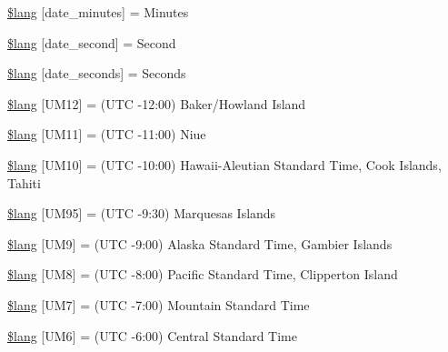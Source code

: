 \begin{DoxyCompactItemize}
\item 
\hyperlink{date__lang_8php_ab41862e6c3ef784a6e32992cfb9a6e1c}{\$lang} \mbox{[}\textquotesingle{}date\+\_\+minutes\textquotesingle{}\mbox{]} = \textquotesingle{}Minutes\textquotesingle{}
\item 
\hyperlink{date__lang_8php_ac1b67b9034a78d631bf5302df6105136}{\$lang} \mbox{[}\textquotesingle{}date\+\_\+second\textquotesingle{}\mbox{]} = \textquotesingle{}Second\textquotesingle{}
\item 
\hyperlink{date__lang_8php_a0a75c76e6e4be09a6c5f1a1727fa2c78}{\$lang} \mbox{[}\textquotesingle{}date\+\_\+seconds\textquotesingle{}\mbox{]} = \textquotesingle{}Seconds\textquotesingle{}
\item 
\hyperlink{date__lang_8php_aa03db528f49f0bdd57489a7e057a95dc}{\$lang} \mbox{[}\textquotesingle{}U\+M12\textquotesingle{}\mbox{]} = \textquotesingle{}(U\+T\+C -\/12\+:00) Baker/Howland Island\textquotesingle{}
\item 
\hyperlink{date__lang_8php_a2257b69398113162bdafb48f1bab4973}{\$lang} \mbox{[}\textquotesingle{}U\+M11\textquotesingle{}\mbox{]} = \textquotesingle{}(U\+T\+C -\/11\+:00) Niue\textquotesingle{}
\item 
\hyperlink{date__lang_8php_a671d507e120e16f7e7718be0ed0aea74}{\$lang} \mbox{[}\textquotesingle{}U\+M10\textquotesingle{}\mbox{]} = \textquotesingle{}(U\+T\+C -\/10\+:00) Hawaii-\/Aleutian Standard Time, Cook Islands, Tahiti\textquotesingle{}
\item 
\hyperlink{date__lang_8php_a7cd7a4418ccf42c7daae2a098ba8f9e6}{\$lang} \mbox{[}\textquotesingle{}U\+M95\textquotesingle{}\mbox{]} = \textquotesingle{}(U\+T\+C -\/9\+:30) Marquesas Islands\textquotesingle{}
\item 
\hyperlink{date__lang_8php_a5509302f8ddd971cb58e1f49f012bbac}{\$lang} \mbox{[}\textquotesingle{}U\+M9\textquotesingle{}\mbox{]} = \textquotesingle{}(U\+T\+C -\/9\+:00) Alaska Standard Time, Gambier Islands\textquotesingle{}
\item 
\hyperlink{date__lang_8php_ab3ed4c273fcb61197ef7d8e4bae07415}{\$lang} \mbox{[}\textquotesingle{}U\+M8\textquotesingle{}\mbox{]} = \textquotesingle{}(U\+T\+C -\/8\+:00) Pacific Standard Time, Clipperton Island\textquotesingle{}
\item 
\hyperlink{date__lang_8php_aa642f12cf461f915682b17c0c30b2475}{\$lang} \mbox{[}\textquotesingle{}U\+M7\textquotesingle{}\mbox{]} = \textquotesingle{}(U\+T\+C -\/7\+:00) Mountain Standard Time\textquotesingle{}
\item 
\hyperlink{date__lang_8php_a30f39dd7748d488f4a0140751336d257}{\$lang} \mbox{[}\textquotesingle{}U\+M6\textquotesingle{}\mbox{]} = \textquotesingle{}(U\+T\+C -\/6\+:00) Central Standard Time\textquotesingle{}

\end{DoxyCompactItemize}
